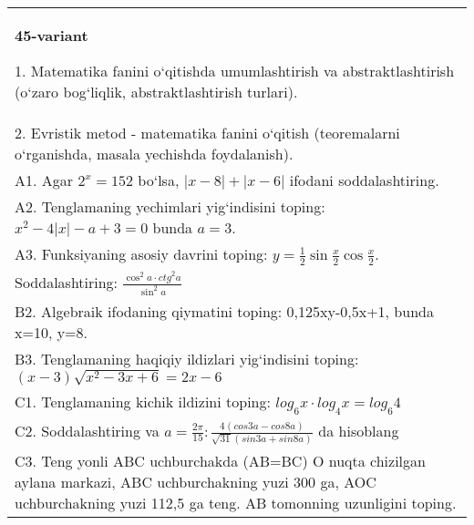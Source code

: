 \documentclass{article}
\begin{document}
\begin{tabular}{m{17cm}}
\textbf{45-variant}

1. Matematika fanini o‘qitishda umumlashtirish va abstraktlashtirish (o‘zaro bog‘liqlik, abstraktlashtirish turlari). \\
2. Evristik metod - matematika fanini o‘qitish (teoremalarni o‘rganishda, masala yechishda foydalanish). \\
A1. Agar \(2^{x} = 152\) bo‘lsa, \(|x - 8| + |x - 6|\) ifodani soddalashtiring. \\
A2. Tenglamaning yechimlari yig‘indisini toping: \(x^2 - 4|x| - a + 3 = 0\) bunda \(a = 3\). \\
A3. Funksiyaning asosiy davrini toping: \(y = \frac{1}{2}\sin{\frac{x}{2}\cos\frac{x}{2}}\). \\
Soddalashtiring: \(\frac{\cos^{2}a \cdot {ctg}^{2}a}{\sin^{2}a}\) \\
B2. Algebraik ifodaning qiymatini toping: 0,125xy-0,5x+1, bunda x=10, y=8. \\
B3. Tenglamaning haqiqiy ildizlari yig‘indisini toping: \((x-3) \sqrt{x^{2} - 3x + 6} = 2x - 6\) \\
C1. Tenglamaning kichik ildizini toping: \(log_{6}x \cdot log_{4}x = log_{6}4\) \\
C2. Soddalashtiring va \(a = \frac{2\pi}{15}:\frac{4 (cos3a - cos8a) }{\sqrt{31} (sin3a + sin8a) }\) da hisoblang \\
C3. Teng yonli ABC uchburchakda (AB=BC) O nuqta chizilgan aylana markazi, ABC uchburchakning yuzi 300 ga, AOC uchburchakning yuzi 112,5 ga teng. AB tomonning uzunligini toping. \\

\end{tabular}
\vspace{1cm}
\end{document}
